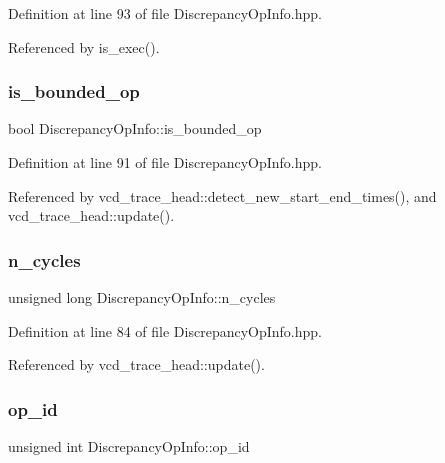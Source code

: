 Definition at line 93 of file Discrepancy\+Op\+Info.\+hpp.



Referenced by is\+\_\+exec().

\mbox{\label{classDiscrepancyOpInfo_a84075a05542c612833c1edd7e1517911}} 
\subsubsection{\texorpdfstring{is\+\_\+bounded\+\_\+op}{is\_bounded\_op}}
{\footnotesize\ttfamily bool Discrepancy\+Op\+Info\+::is\+\_\+bounded\+\_\+op}



Definition at line 91 of file Discrepancy\+Op\+Info.\+hpp.



Referenced by vcd\+\_\+trace\+\_\+head\+::detect\+\_\+new\+\_\+start\+\_\+end\+\_\+times(), and vcd\+\_\+trace\+\_\+head\+::update().

\mbox{\label{classDiscrepancyOpInfo_a55176f34c8219cd3876fadd2ff157300}} 
\subsubsection{\texorpdfstring{n\+\_\+cycles}{n\_cycles}}
{\footnotesize\ttfamily unsigned long Discrepancy\+Op\+Info\+::n\+\_\+cycles}



Definition at line 84 of file Discrepancy\+Op\+Info.\+hpp.



Referenced by vcd\+\_\+trace\+\_\+head\+::update().

\mbox{\label{classDiscrepancyOpInfo_adee91c8c6dfc27ad92bed475f2f63b8c}} 
\subsubsection{\texorpdfstring{op\+\_\+id}{op\_id}}
{\footnotesize\ttfamily unsigned int Discrepancy\+Op\+Info\+::op\+\_\+id}



